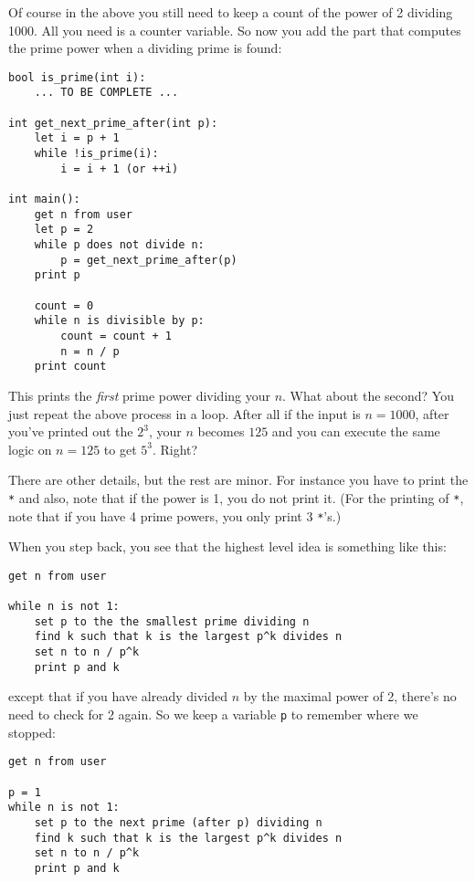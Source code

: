 Of course in the above you still need to keep a count of the power of 2 dividing
1000.
All you need is a counter variable.
So now you add the part that computes the prime power when a dividing prime is found:
{\small
\begin{Verbatim}[frame=single]
bool is_prime(int i):
    ... TO BE COMPLETE ...
    
int get_next_prime_after(int p):
    let i = p + 1
    while !is_prime(i):
        i = i + 1 (or ++i)

int main():
    get n from user
    let p = 2
    while p does not divide n:
        p = get_next_prime_after(p)
    print p

    count = 0
    while n is divisible by p:
        count = count + 1
        n = n / p
    print count
\end{Verbatim}
}

This prints the \textit{first} prime power dividing your $n$.
What about the second?
You just repeat the above process in a loop.
After all if the input is $n = 1000$, after you've printed out the $2^3$,
your $n$ becomes $125$ and you can execute the same logic on $n = 125$
to get $5^3$. Right?

There are other details, but the rest are minor.
For instance you have to print the \verb!*!
and also, note that if the power is 1, you do not print it.
(For the printing of \verb!*!, note that if you have 4 prime powers, you only print 3 \verb!*!'s.)

When you step back, you see that the highest level idea is something like this:
{\small
\begin{Verbatim}[frame=single]
get n from user

while n is not 1:
    set p to the the smallest prime dividing n 
    find k such that k is the largest p^k divides n
    set n to n / p^k
    print p and k
\end{Verbatim}
}
except that if you have already divided $n$ by the maximal power of 2, there's no
need to check for 2 again.
So we keep a variable \verb!p! to remember where we stopped:
{\small
\begin{Verbatim}[frame=single]
get n from user

p = 1
while n is not 1:
    set p to the next prime (after p) dividing n
    find k such that k is the largest p^k divides n
    set n to n / p^k
    print p and k
\end{Verbatim}
}
